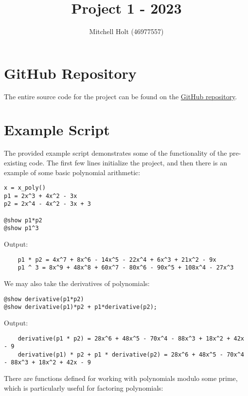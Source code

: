 \documentclass{article}
\title{Project 1 - 2023}
\author{Mitchell Holt (46977557)}
\theoremstyle{plain}
\numberwithin{theorem}{section}
\numberwithin{example}{section}
\theoremstyle{definition}
\numberwithin{definition}{section}
\begin{document}
\maketitle

\tableofcontents

\newpage

\section{GitHub Repository}

The entire source code for the project can be found on the
\href{https://github.com/mitchellholt/Mitchell-Holt-2504-2023-PROJECT1}
{\color{blue}GitHub repository}.


\section{Example Script}
The provided example script demonstrates some of the functionality of the
pre-existing code. The first few lines initialize the project, and then there is
an example of some basic polynomial arithmetic:

\begin{codebox}
    \begin{Verbatim}
x = x_poly()
p1 = 2x^3 + 4x^2 - 3x
p2 = 2x^4 - 4x^2 - 3x + 3

@show p1*p2
@show p1^3
    \end{Verbatim}
\end{codebox}

Output:
\begin{Verbatim}
    p1 * p2 = 4x^7 + 8x^6 - 14x^5 - 22x^4 + 6x^3 + 21x^2 - 9x
    p1 ^ 3 = 8x^9 + 48x^8 + 60x^7 - 80x^6 - 90x^5 + 108x^4 - 27x^3
\end{Verbatim}
We may also take the derivatives of polynomials:

\begin{codebox}
    \begin{Verbatim}
@show derivative(p1*p2)
@show derivative(p1)*p2 + p1*derivative(p2);
    \end{Verbatim}
\end{codebox}

Output:
\begin{Verbatim}
    derivative(p1 * p2) = 28x^6 + 48x^5 - 70x^4 - 88x^3 + 18x^2 + 42x - 9
    derivative(p1) * p2 + p1 * derivative(p2) = 28x^6 + 48x^5 - 70x^4 - 88x^3 + 18x^2 + 42x - 9
\end{Verbatim}

There are functions defined for working with polynomials modulo some prime,
which is particularly useful for factoring polynomials:
\end{document}
